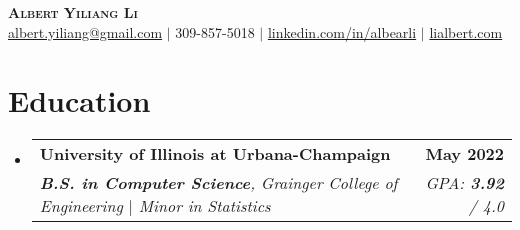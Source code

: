 \documentclass[letterpaper,11pt]{article}
\makeatletter
\newcommand{\resumeSubheading}[4]{
  \vspace{-2pt}
  \item
    \begin{tabular*}{1\textwidth}[t]{l@{\extracolsep{\fill}}r}
      \large{\textbf{#1}} & \small{\textbf{#2}} \\
      \textit{\small#3} & \textit{\small #4} \\
    \end{tabular*}\vspace{-7pt}
}
\newcommand{\resumeSubHeadingListStart}{\begin{itemize}[leftmargin=0in, label={}]}
\newcommand{\resumeSubHeadingListEnd}{\end{itemize}}
\makeatother
\begin{document}
\begin{center}

    \textbf{\Huge \scshape \textnormal{\textbf{Albert} Yiliang \textbf{Li}}} \\ \vspace{8pt}
    \small{
    \href{mailto:albert.yiliang@gmail.com}{albert.yiliang@gmail.com} $|$ 309-857-5018 $|$  
    \href{https://linkedin.com/in/albearli}{linkedin.com/in/albearli} $|$
    \href{https://lialbert.com}{lialbert.com}}
\end{center}
\vspace{-15pt}
\section{Education}
  \resumeSubHeadingListStart
    \resumeSubheading
      {University of Illinois at Urbana-Champaign}{May 2022} %
      {\textnormal{\textbf{B.S. in Computer Science}, Grainger College of Engineering $|$ Minor in Statistics}}{\textnormal{GPA: \textbf{3.92} / 4.0}}
      
  \resumeSubHeadingListEnd



\end{document}
